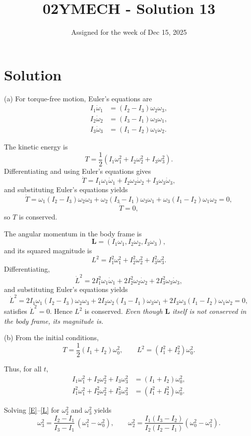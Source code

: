 \documentclass[12pt]{article}
\title{02YMECH - Solution 13}
\date{Assigned for the week of Dec 15, 2025}
\author{}
\begin{document}
\maketitle

\section*{Solution}

(a) For torque-free motion, Euler's equations are
\[
\begin{aligned}
I_1\dot{\omega}_1 &= (I_2-I_3)\omega_2\omega_3,\\
I_2\dot{\omega}_2 &= (I_3-I_1)\omega_3\omega_1,\\
I_3\dot{\omega}_3 &= (I_1-I_2)\omega_1\omega_2.
\end{aligned}
\]

The kinetic energy is
\[
T=\frac12\left(I_1\omega_1^2+I_2\omega_2^2+I_3\omega_3^2\right).
\]
Differentiating and using Euler’s equations gives
\[
\dot T = I_1\omega_1\dot{\omega}_1 + I_2\omega_2\dot{\omega}_2 + I_3\omega_3\dot{\omega}_3,
\]
and substituting Euler's equations yields
\[
\dot T = \omega_1(I_2-I_3)\omega_2\omega_3 + \omega_2(I_3-I_1)\omega_3\omega_1 + \omega_3(I_1-I_2)\omega_1\omega_2 = 0,
\]
\[
\dot T=0,
\]
so \(T\) is conserved.

The angular momentum in the body frame is
\[
\mathbf L=(I_1\omega_1,I_2\omega_2,I_3\omega_3),
\]
and its squared magnitude is
\[
L^2=I_1^2\omega_1^2+I_2^2\omega_2^2+I_3^2\omega_3^2.
\]
Differentiating,
\[
\dot L^2 = 2I_1^2\omega_1\dot{\omega}_1 + 2I_2^2\omega_2\dot{\omega}_2 + 2I_3^2\omega_3\dot{\omega}_3,
\]
and substituting Euler's equations yields
\[
\dot L^2 = 2I_1\omega_1(I_2-I_3)\omega_2\omega_3 + 2I_2\omega_2(I_3-I_1)\omega_3\omega_1 + 2I_3\omega_3(I_1-I_2)\omega_1\omega_2 = 0,
\]
satisfies \(\dot L^2=0\). Hence \(L^2\) is conserved. \emph{Even though \(\mathbf L\) itself is not conserved in the body frame, its magnitude is.}


(b) From the initial conditions,
\[
T=\frac12(I_1+I_2)\omega_0^2,
\qquad
L^2=(I_1^2+I_2^2)\omega_0^2.
\]

Thus, for all \(t\),
\begin{align}
I_1\omega_1^2+I_2\omega_2^2+I_3\omega_3^2
&=(I_1+I_2)\omega_0^2, \label{E}\\
I_1^2\omega_1^2+I_2^2\omega_2^2+I_3^2\omega_3^2
&=(I_1^2+I_2^2)\omega_0^2. \label{L}
\end{align}

Solving \eqref{E}--\eqref{L} for \(\omega_2^2\) and \(\omega_3^2\) yields
\[
\omega_3^2
=
\frac{I_2-I_1}{I_3-I_1}\,(\omega_1^2-\omega_0^2),
\qquad
\omega_2^2
=
\frac{I_1(I_3-I_2)}{I_2(I_2-I_1)}(\omega_0^2-\omega_1^2).
\]
\end{document}
